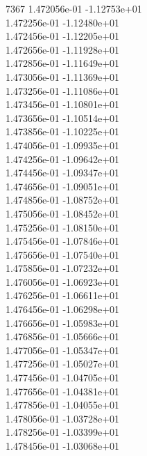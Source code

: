 7367	1.472056e-01	-1.12753e+01	\\ 	1.472256e-01	-1.12480e+01	\\ 	1.472456e-01	-1.12205e+01	\\ 	1.472656e-01	-1.11928e+01	\\ 	1.472856e-01	-1.11649e+01	\\ 	1.473056e-01	-1.11369e+01	\\ 	1.473256e-01	-1.11086e+01	\\ 	1.473456e-01	-1.10801e+01	\\ 	1.473656e-01	-1.10514e+01	\\ 	1.473856e-01	-1.10225e+01	\\ 	1.474056e-01	-1.09935e+01	\\ 	1.474256e-01	-1.09642e+01	\\ 	1.474456e-01	-1.09347e+01	\\ 	1.474656e-01	-1.09051e+01	\\ 	1.474856e-01	-1.08752e+01	\\ 	1.475056e-01	-1.08452e+01	\\ 	1.475256e-01	-1.08150e+01	\\ 	1.475456e-01	-1.07846e+01	\\ 	1.475656e-01	-1.07540e+01	\\ 	1.475856e-01	-1.07232e+01	\\ 	1.476056e-01	-1.06923e+01	\\ 	1.476256e-01	-1.06611e+01	\\ 	1.476456e-01	-1.06298e+01	\\ 	1.476656e-01	-1.05983e+01	\\ 	1.476856e-01	-1.05666e+01	\\ 	1.477056e-01	-1.05347e+01	\\ 	1.477256e-01	-1.05027e+01	\\ 	1.477456e-01	-1.04705e+01	\\ 	1.477656e-01	-1.04381e+01	\\ 	1.477856e-01	-1.04055e+01	\\ 	1.478056e-01	-1.03728e+01	\\ 	1.478256e-01	-1.03399e+01	\\ 	1.478456e-01	-1.03068e+01	\\ \hline
